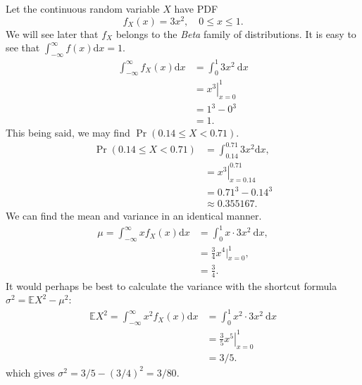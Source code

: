 \documentclass[captions=tableheading]{scrbook}
\begin{document}
\begin{example}

Let the continuous random variable \(X\) have PDF
\[
f_{X}(x)=3x^{2},\quad0\leq x\leq 1.
\]
We will see later that \(f_{X}\) belongs to the \emph{Beta} family of distributions. It is easy to see that \(\int_{-\infty}^{\infty}f(x)\mathrm{d} x=1\).
\begin{align*}
\int_{-\infty}^{\infty}f_{X}(x)\mathrm{d} x & =\int_{0}^{1}3x^{2}\:\mathrm{d} x\\
 & =\left.x^{3}\right|_{x=0}^{1}\\
 & =1^{3}-0^{3}\\
 & =1.
\end{align*}
This being said, we may find \(\Pr(0.14\leq X<0.71)\).
\begin{align*}
\Pr(0.14\leq X<0.71) & =\int_{0.14}^{0.71}3x^{2}\mathrm{d} x,\\
 & =\left.x^{3}\right|_{x=0.14}^{0.71}\\
 & =0.71^{3}-0.14^{3}\\
 & \approx0.355167.
\end{align*}
We can find the mean and variance in an identical manner.
\begin{align*}
\mu=\int_{-\infty}^{\infty}xf_{X}(x)\mathrm{d} x & =\int_{0}^{1}x\cdot3x^{2}\:\mathrm{d} x,\\
 & =\frac{3}{4}x^{4}|_{x=0}^{1},\\
 & =\frac{3}{4}.
\end{align*}
It would perhaps be best to calculate the variance with the shortcut formula \(\sigma^{2}=\mathbb{E} X^{2}-\mu^{2}\):
\begin{align*}
\mathbb{E} X^{2}=\int_{-\infty}^{\infty}x^{2}f_{X}(x)\mathrm{d} x & =\int_{0}^{1}x^{2}\cdot3x^{2}\:\mathrm{d} x\\
 & =\left.\frac{3}{5}x^{5}\right|_{x=0}^{1}\\
 & =3/5.
\end{align*}
which gives \(\sigma^{2}=3/5-(3/4)^{2}=3/80\).
\end{example}
\end{document}
